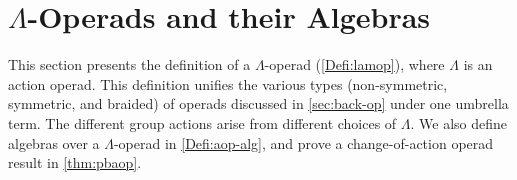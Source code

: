 

\section{\texorpdfstring{$\Lambda$}{L}-Operads and their Algebras}\label{sec:forward-op}

This section presents the definition of a $\Lambda$-operad (\cref{Defi:lamop}), where $\Lambda$ is an action operad.
This definition unifies the various types (non-symmetric, symmetric, and braided) of operads discussed in \cref{sec:back-op} under one umbrella term.
The different group actions arise from different choices of $\Lambda$.
We also define algebras over a $\Lambda$-operad in \cref{Defi:aop-alg}, and prove a change-of-action operad result in \cref{thm:pbaop}.

